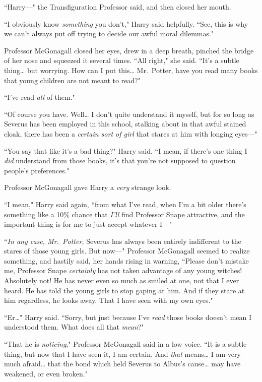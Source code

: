 ``Harry—" the Transfiguration Professor said, and then closed her mouth.

``I obviously know \emph{something} you don't," Harry said helpfully. ``See, this is why we can't always put off trying to decide our awful moral dilemmas."

Professor McGonagall closed her eyes, drew in a deep breath, pinched the bridge of her nose and squeezed it several times. ``All right," she said. ``It's a subtle thing{\ldots} but worrying. How can I put this{\ldots} Mr.~Potter, have you read many books that young children are not meant to read?"

``I've read \emph{all} of them."

``Of course you have. Well{\ldots} I don't quite understand it myself, but for so long as Severus has been employed in this school, stalking about in that awful stained cloak, there has been a \emph{certain sort of girl} that stares at him with longing eyes—"

``You say that like it's a bad thing?" Harry said. ``I mean, if there's one thing I \emph{did} understand from those books, it's that you're not supposed to question people's preferences."

Professor McGonagall gave Harry a \emph{very} strange look.

``I mean," Harry said again, ``from what I've read, when I'm a bit older there's something like a 10\% chance that \emph{I'll} find Professor Snape attractive, and the important thing is for me to just accept whatever I—"

``\emph{In any case, Mr.~Potter,} Severus has always been entirely indifferent to the stares of those young girls. But now—" Professor McGonagall seemed to realize something, and hastily said, her hands rising in warning, ``Please don't mistake me, Professor Snape \emph{certainly} has not taken advantage of any young witches! Absolutely not! He has never even so much as smiled at one, not that I ever heard. He has told the young girls to stop gaping at him. And if they stare at him regardless, he looks away. That I have seen with my own eyes."

``Er{\ldots}" Harry said. ``Sorry, but just because I've \emph{read} those books doesn't mean I understood them. What does all that \emph{mean}?"

``That he is \emph{noticing}," Professor McGonagall said in a low voice. ``It is a subtle thing, but now that I have seen it, I am certain. And \emph{that} means{\ldots} I am very much afraid{\ldots} that the bond which held Severus to Albus's cause{\ldots} may have weakened, or even broken."

